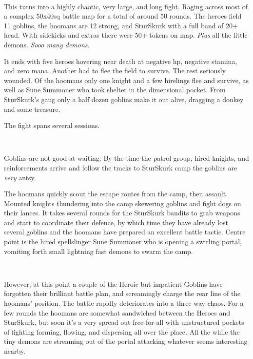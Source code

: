 \

This turns into a highly chaotic, very large, and long fight. Raging across most of a complex 50x40sq battle map for a total of around 50 rounds. The heroes field 11 goblins, the hoomans are 12 strong, and SturSkurk with a full band of 20+ head. With sidekicks and extras there were 50+ tokens on map. \emph{Plus} all the little demons. \emph{Sooo many demons.}

It ends with five heroes hovering near death at negative hp, negative stamina, and zero mana. Another had to flee the field to survive. The rest seriously wounded. Of the hoomans only one knight and a few hirelings flee and survive, as well as Sune Summoner who took shelter in the dimensional pocket. From SturSkurk's gang only a half dozen goblins make it out alive, dragging a donkey and some treasure.

The fight spans several sessions.

\

Goblins are not good at waiting. By the time the patrol group, hired knights, and reinforcements arrive and follow the tracks to SturSkurk camp the goblins are \emph{very} antsy.

The hoomans quickly scout the escape routes from the camp, then assault. Mounted knights thundering into the camp skewering goblins and fight dogs on their lances. It takes several rounds for the SturSkurk bandits to grab weapons and start to coordinate their defence, by which time they have already lost several goblins and the hoomans have prepared an excellent battle tactic. Centre point is the hired spellslinger Sune Summoner who is opening a swirling portal, vomiting forth small lightning fast demons to swarm the camp.

\

However, at this point a couple of the Heroic but impatient Goblins have forgotten their brilliant battle plan, and screamingly charge the rear line of the hoomans' position. The battle rapidly deteriorates into a three way chaos. For a few rounds the hoomans are somewhat sandwiched between the Heroes and SturSkurk, but soon it's a very spread out free-for-all with unstructured pockets of fighting forming, flowing, and dispersing all over the place. All the while the tiny demons are streaming out of the portal attacking whatever seems interesting nearby. 

\



